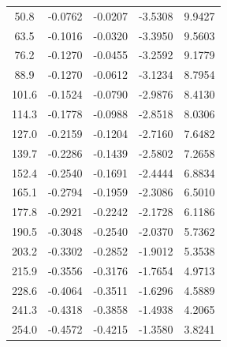 \documentclass[12pt]{article}
\begin{document}
\begin{center}
\begin{tabular}{ccccc}
50.8                 & -0.0762              & -0.0207              & -3.5308              & 9.9427               \\
63.5                 & -0.1016              & -0.0320              & -3.3950              & 9.5603               \\
76.2                 & -0.1270              & -0.0455              & -3.2592              & 9.1779               \\
88.9                 & -0.1270              & -0.0612              & -3.1234              & 8.7954               \\
101.6                & -0.1524              & -0.0790              & -2.9876              & 8.4130               \\
114.3                & -0.1778              & -0.0988              & -2.8518              & 8.0306               \\
127.0                & -0.2159              & -0.1204              & -2.7160              & 7.6482               \\
139.7                & -0.2286              & -0.1439              & -2.5802              & 7.2658               \\
152.4                & -0.2540              & -0.1691              & -2.4444              & 6.8834               \\
165.1                & -0.2794              & -0.1959              & -2.3086              & 6.5010               \\
177.8                & -0.2921              & -0.2242              & -2.1728              & 6.1186               \\
190.5                & -0.3048              & -0.2540              & -2.0370              & 5.7362               \\
203.2                & -0.3302              & -0.2852              & -1.9012              & 5.3538               \\
215.9                & -0.3556              & -0.3176              & -1.7654              & 4.9713               \\
228.6                & -0.4064              & -0.3511              & -1.6296              & 4.5889               \\
241.3                & -0.4318              & -0.3858              & -1.4938              & 4.2065               \\
254.0                & -0.4572              & -0.4215              & -1.3580              & 3.8241               \\

\end{tabular}
\end{center}
\end{document}
